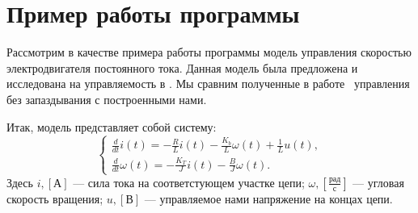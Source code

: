 \section{Пример работы программы}

Рассмотрим в качестве примера работы программы модель управления скоростью электродвигателя постоянного тока. Данная модель была предложена и исследована на управляемость в \cite{baghdad}. Мы сравним полученные в работе~\cite{baghdad} управления без запаздывания с построенными нами.

Итак, модель представляет собой систему:
\begin{equation}\label{eq:example}
\begin{cases}
\frac{d}{dt}i(t)
=
-\frac{R}{L}i(t)
-
\frac{K_b}{L}\omega(t)
+
\frac{1}{L}u(t),\\
\frac{d}{dt}\omega(t)
=
-\frac{K_T}{J}i(t)
-
\frac{B}{J}\omega(t).
\end{cases}
\end{equation}
Здесь $i,[\mbox{А}]$ --- сила тока на соответстующем участке цепи; $\omega,\left[\frac{\mbox{рад}}{\mbox{с}}\right]$ --- угловая скорость вращения; $u,[\mbox{В}]$ --- управляемое нами напряжение на концах цепи. 

